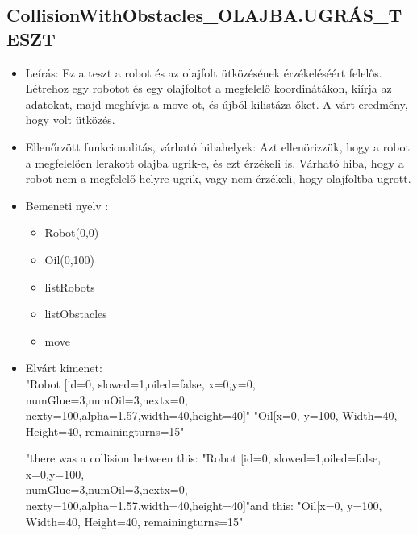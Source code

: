\subsection{CollisionWithObstacles\_OLAJBA.UGRÁS\_TESZT}
\begin{itemize}
	\item Leírás: Ez a teszt a robot és az olajfolt ütközésének érzékeléséért felelős.
	                Létrehoz egy robotot és egy olajfoltot a megfelelő koordinátákon, kiírja az adatokat, majd meghívja a move-ot, és újból kilistáza őket. A várt eredmény, hogy volt ütközés.
\newline
	\item  Ellenőrzött funkcionalitás, várható hibahelyek: Azt ellenörizzük, hogy a robot a megfelelően lerakott olajba ugrik-e, és ezt érzékeli is.
		   Várható hiba, hogy a robot nem a megfelelő helyre ugrik, vagy nem érzékeli, hogy olajfoltba ugrott.
	\item Bemeneti nyelv :
		\begin{itemize}
		\item Robot(0,0)
		\item Oil(0,100)
		\item listRobots
		\item listObstacles
		\item move
		\end{itemize}
	
	\item Elvárt kimenet: \\
		"Robot [id=0,  slowed=1,oiled=false, x=0,y=0, 
		\\numGlue=3,numOil=3,nextx=0,
		\\nexty=100,alpha=1.57,width=40,height=40]"\newline
		"Oil[x=0, y=100, Width=40, Height=40, remainingturns=15"\newline
		
		"there was a collision between this: "Robot [id=0,  slowed=1,oiled=false, x=0,y=100, 
		\\numGlue=3,numOil=3,nextx=0,
		\\nexty=100,alpha=1.57,width=40,height=40]"\newline and this: "Oil[x=0, y=100, Width=40, Height=40, remainingturns=15"\newline
\end{itemize}

